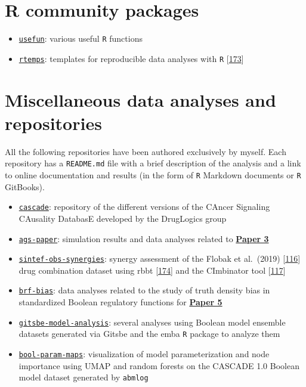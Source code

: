 \documentclass[
  12pt,
]{book}
\providecommand{\tightlist}{%
  \setlength{\itemsep}{0pt}\setlength{\parskip}{0pt}}
\begin{document}
\hypertarget{r-community-packages}{%
\section*{R community packages}\label{r-community-packages}}

\begin{itemize}
\tightlist
\item
  \href{https://github.com/bblodfon/usefun}{\texttt{usefun}}: various useful \texttt{R} functions
\item
  \href{https://github.com/bblodfon/rtemps}{\texttt{rtemps}}: templates for reproducible data analyses with \texttt{R} {[}\protect\hyperlink{ref-rtemps}{173}{]}
\end{itemize}

\hypertarget{misc-links}{%
\section*{Miscellaneous data analyses and repositories}\label{misc-links}}

All the following repositories have been authored exclusively by myself.
Each repository has a \texttt{README.md} file with a brief description of the analysis and a link to online documentation and results (in the form of \texttt{R} Markdown documents or \texttt{R} GitBooks).

\begin{itemize}
\tightlist
\item
  \href{https://github.com/druglogics/cascade}{\texttt{cascade}}: repository of the different versions of the CAncer Signaling CAusality DatabasE developed by the DrugLogics group
\item
  \href{https://github.com/druglogics/ags-paper}{\texttt{ags-paper}}: simulation results and data analyses related to \textbf{\protect\hyperlink{Paper3}{Paper 3}}
\item
  \href{https://github.com/druglogics/sintef-obs-synergies}{\texttt{sintef-obs-synergies}}: synergy assessment of the Flobak et al.~(2019) {[}\protect\hyperlink{ref-Flobak2019}{116}{]} drug combination dataset using rbbt {[}\protect\hyperlink{ref-Vazquez2010}{174}{]} and the CImbinator tool {[}\protect\hyperlink{ref-Flobak2017}{117}{]}
\item
  \href{https://github.com/druglogics/brf-bias}{\texttt{brf-bias}}: data analyses related to the study of truth density bias in standardized Boolean regulatory functions for \textbf{\protect\hyperlink{Paper5}{Paper 5}}
\item
  \href{https://github.com/druglogics/gitsbe-model-analysis}{\texttt{gitsbe-model-analysis}}: several analyses using Boolean model ensemble datasets generated via Gitsbe and the emba \texttt{R} package to analyze them
\item
  \href{https://github.com/druglogics/bool-param-maps}{\texttt{bool-param-maps}}: visualization of model parameterization and node importance using UMAP and random forests on the CASCADE 1.0 Boolean model dataset generated by \texttt{abmlog}
\end{itemize}
\end{document}
